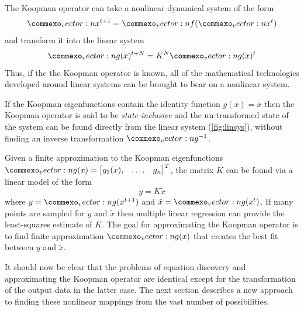 \documentclass{article}
\renewcommand{\vec}[1]{\vect{#1}}
\begin{document}
The Koopman operator can take a nonlinear dynamical system of the form
\begin{equation}
\vec{x}^{t+1} = \vec{f}(\vec{x}^t)
\end{equation}
and transform it into the linear system
\begin{equation}
\label{fig:linsys}
\vec{g}(x)^{t+N} = K^N \vec{g}(x)^{t}
\end{equation}
Thus, if the the Koopman operator is known, all of the mathematical technologies developed around linear systems can be brought to bear on a nonlinear system. 

If the Koopman eigenfunctions contain the identity function $g(x) = x$ then the Koopman operator is said to be \emph{state-inclusive} and the un-transformed state of the system can be found directly from the linear system (\ref{fig:linsys}), without finding an inverse transformation $\vec{g}^{-1}$.

Given a finite approximation to the Koopman eigenfunctions $\vec{g}(x) = \begin{bmatrix} g_1(x), & \hdots, & g_n \end{bmatrix}^T$, the matrix $K$ can be found via a linear model of the form 
\[ y = K \tilde{x} \]
where $y = \vec{g}(x^{t+1})$ and $\tilde{x} = \vec{g}(x^t)$. If many points are sampled for $y$ and $\tilde{x}$ then multiple linear regression can provide the least-squares estimate of $K$. The goal for approximating the Koopman operator is to find finite approximation $\vec{g}(x)$ that creates the best fit between $y$ and $\tilde{x}$.

It should now be clear that the problems of equation discovery and approximating the Koopman operator are identical except for the transformation of the output data in the latter case. The next section describes a new approach to finding these nonlinear mappings from the vast number of possibilities.
\end{document}
